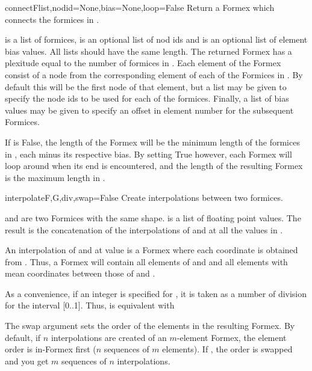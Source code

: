 \begin{funcdesc}{connect}{Flist,nodid=None,bias=None,loop=False}
Return a Formex which connects the formices in .

 is a list of formices,  is an optional list of nod ids and  is an optional list of element bias values. All lists should have the same length. The returned Formex has a plexitude equal to the number of formices in . Each element of the Formex consist of a node from the corresponding element of each of the Formices in . By default this will be the first node of that element, but a  list may be given to specify the node ids to be used for each of the formices. Finally, a list of bias values may be given to specify an offset in element number for the subsequent Formices.

If  is False, the length of the Formex will be the minimum length of the formices in , each minus its respective bias. By setting  True however, each Formex will loop around when its end is encountered, and the length of the resulting Formex is the maximum length in .
\end{funcdesc}


\begin{funcdesc}{interpolate}{F,G,div,swap=False}
Create interpolations between two formices.

 and  are two Formices with the same shape.
 is a list of floating point values.
The result is the concatenation of the interpolations of  and  at all the values in .

An interpolation of  and  at value  is a Formex  where each coordinate  is obtained from  .
Thus, a Formex  will contain all elements
of  and  and all elements with mean coordinates between those of  and .

As a convenience, if an integer is specified for , it is taken as a
number of division for the interval [0..1].
Thus,  is equivalent with

The swap argument sets the order of the elements in the resulting Formex.
By default, if $n$ interpolations are created of an $m$-element Formex, the element order is in-Formex first ($n$ sequences of $m$ elements).
If , the order is swapped and you get $m$ sequences of $n$
interpolations.
\end{funcdesc}


